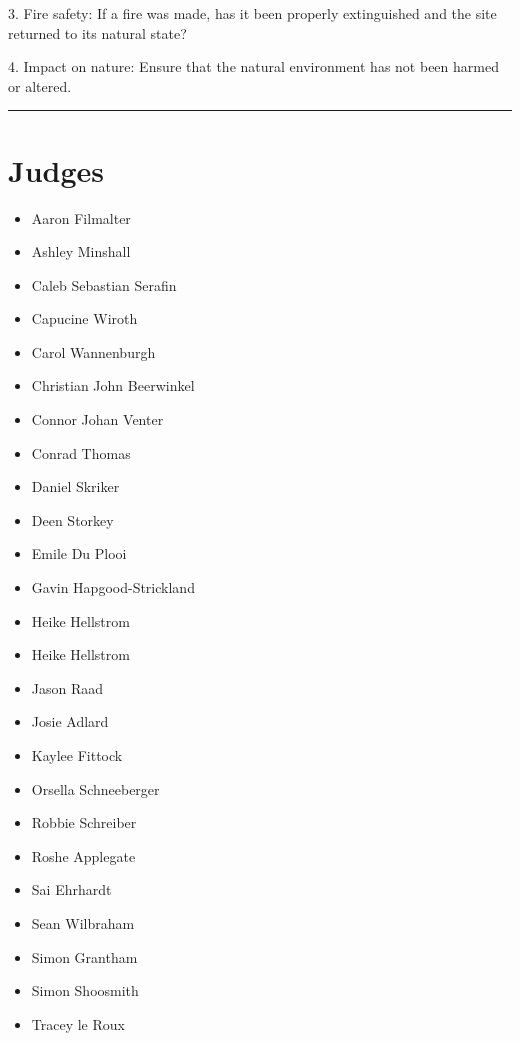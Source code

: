 \documentclass[10pt]{article}
\begin{document}
3. Fire safety: If a fire was made, has it been properly extinguished and the site returned to its natural state?

4. Impact on nature: Ensure that the natural environment has not been harmed or altered.
\vspace{0.5cm}
	\hrule
	\vspace{0.5cm}
		\section*{\faUsers \: Judges}

		

	\begin{multicols}{2}

		\begin{itemize}
									\item Aaron Filmalter
									\item Ashley Minshall
									\item Caleb Sebastian Serafin
									\item Capucine Wiroth
									\item Carol Wannenburgh
									\item Christian John Beerwinkel
									\item Connor Johan Venter
									\item Conrad Thomas
									\item Daniel Skriker
									\item Deen Storkey
									\item Emile Du Plooi
									\item Gavin Hapgood-Strickland
									\item Heike Hellstrom
						\end{itemize}

		\vfill\null
		\columnbreak

		\begin{itemize}
									\item Heike Hellstrom
									\item Jason Raad
									\item Josie Adlard
									\item Kaylee Fittock
									\item Orsella Schneeberger
									\item Robbie Schreiber
									\item Roshe Applegate
									\item Sai Ehrhardt
									\item Sean Wilbraham
									\item Simon Grantham
									\item Simon Shoosmith
									\item Tracey le Roux
						\end{itemize}

		\vfill\null

		\end{multicols}
\end{document}
